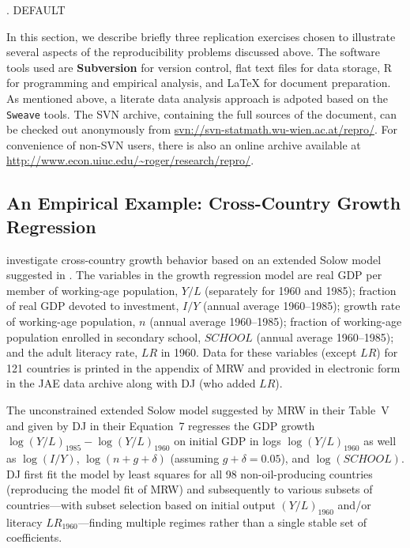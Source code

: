 \documentclass[10pt,a4paper,twoside]{article}
\let\code=\texttt
\let\pkg=\textbf
\let\proglang=\textsf
\renewcommand{\section}{\secdef \mysec \mysecnn}
\newcommand{\mysec}[2][default]{\vspace{1.7\baselineskip}%
  \pdfbookmark[1]{#1}{Section.#1}%
  \refstepcounter{section}%
  \centerline{\large \thesection. \uppercase{#1}} \vspace{.5\baselineskip}}
\newcommand{\mysecnn}[1]{\vspace{1.7\baselineskip}%
  \centerline{\large #1} \vspace{.5\baselineskip}}
\begin{document}
\section{Replication Case Studies} \label{sec:replication}

In this section, we describe briefly three replication exercises chosen
to illustrate several aspects of the reproducibility problems discussed above.
The software tools used are \pkg{Subversion} for version control, flat text files
for data storage, \proglang{R} for programming and empirical analysis, and {\LaTeX}
for document preparation. As mentioned above, a literate data analysis approach is
adpoted based on the \code{Sweave} tools. The SVN archive, containing the
full sources of the document, can be checked out anonymously from
\url{svn://svn-statmath.wu-wien.ac.at/repro/}. For convenience of non-SVN users,
there is also an online archive available at
\url{http://www.econ.uiuc.edu/~roger/research/repro/}.

\subsection{An Empirical Example: Cross-Country Growth Regression} \label{sec:growth}



\citet[henceforth DJ]{repro:Durlauf+Johnson:1995} investigate cross-country
growth behavior based on an extended Solow model suggested in
\citet[henceforth MRW]{repro:Mankiw+Romer+Weil:1992}. The variables in the growth regression
model are real GDP per member of working-age population, $Y/L$
(separately for 1960 and 1985); fraction of real GDP devoted to investment, $I/Y$
(annual average 1960--1985); growth rate of working-age population, $n$ (annual average 1960--1985);
fraction of working-age population enrolled in secondary school, $\mathit{SCHOOL}$
(annual average 1960--1985); and the adult literacy rate, $\mathit{LR}$ in 1960.
Data for these variables (except $\mathit{LR}$) for 121 countries is printed
in the appendix of MRW and provided in electronic form in the JAE data archive along
with DJ (who added $\mathit{LR}$).

The unconstrained extended Solow model suggested by MRW in their Table~V and given by DJ in their
Equation~7 regresses the GDP growth $\log(Y/L)_{1985} - \log(Y/L)_{1960}$ on initial GDP in logs
$\log(Y/L)_{1960}$ as well as $\log(I/Y)$, $\log(n + g + \delta)$ (assuming $g + \delta = 0.05$),
and $\log(\mathit{SCHOOL})$. DJ first fit the model by least squares for all
98 non-oil-producing countries (reproducing the 
model fit of MRW) and subsequently to various subsets of countries---with subset selection based
on initial output $(Y/L)_{1960}$ and/or literacy $\mathit{LR}_{1960}$---finding multiple
regimes rather than a single stable set of coefficients.
\end{document}
